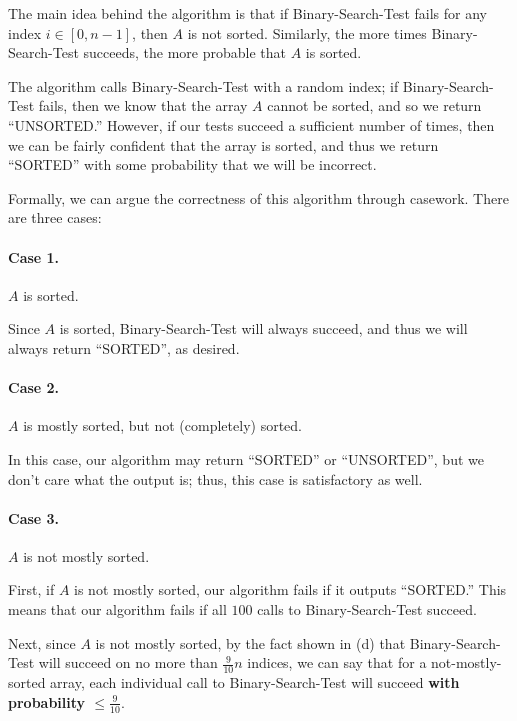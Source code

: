 \documentclass{6046}
\begin{document}
The main idea behind the algorithm is that if {\sc Binary-Search-Test}
fails for any index $i \in [0, n - 1]$, then $A$ is not sorted.
Similarly, the more times {\sc Binary-Search-Test} succeeds, the
more probable that $A$ is sorted.

The algorithm calls {\sc Binary-Search-Test} with a random index;
if {\sc Binary-Search-Test} fails, then we know that the array
$A$ cannot be sorted, and so we return ``UNSORTED.'' However,
if our tests succeed a sufficient number of times, then we
can be fairly confident that the array is sorted, and thus
we return ``SORTED'' with some probability that we will
be incorrect.

Formally, we can argue the correctness of this algorithm
through casework. There are three cases:
\vspace{-1.5em}

\paragraph{Case 1.} $A$ is sorted.
\vspace{-0.75em}

Since $A$ is sorted, {\sc Binary-Search-Test} will always succeed,
and thus we will always return ``SORTED'', as desired.
\vspace{-1em}

\paragraph{Case 2.} $A$ is mostly sorted, but not (completely) sorted.
\vspace{-0.75em}

In this case, our algorithm may return ``SORTED'' or ``UNSORTED'',
but we don't care what the output is; thus, this case is
satisfactory as well.
\vspace{-1em}

\paragraph{Case 3.} $A$ is not mostly sorted.
\vspace{-0.75em}

First, if $A$ is not mostly sorted, our algorithm fails
if it outputs ``SORTED.'' This means that our algorithm
fails if all $100$ calls to {\sc Binary-Search-Test} succeed.

Next, since $A$ is not mostly sorted, by the fact shown in (d) that
{\sc Binary-Search-Test} will succeed on no more than
$\frac{9}{10}n$ indices, we can say that
for a not-mostly-sorted array, each individual call to
{\sc Binary-Search-Test} will succeed {\bf with probability $\le \frac{9}{10}$}.
\end{document}
